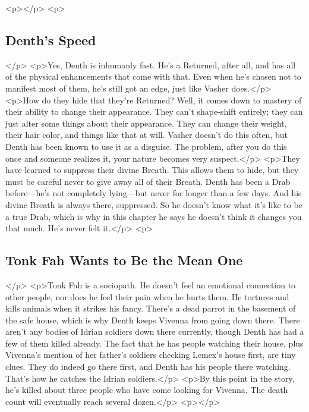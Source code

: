 <p></p>
<p>\subsection*{Denth’s Speed}</p>
<p>Yes, Denth is inhumanly fast. He’s a Returned, after all, and has all of the physical enhancements that come with that. Even when he’s chosen not to manifest most of them, he’s still got an edge, just like Vasher does.</p>
<p>How do they hide that they’re Returned? Well, it comes down to mastery of their ability to change their appearance. They can’t shape-shift entirely; they can just alter some things about their appearance. They can change their weight, their hair color, and things like that at will. Vasher doesn’t do this often, but Denth has been known to use it as a disguise. The problem, after you do this once and someone realizes it, your nature becomes very suspect.</p>
<p>They have learned to suppress their divine Breath. This allows them to hide, but they must be careful never to give away all of their Breath. Denth has been a Drab before—he’s not completely lying—but never for longer than a few days. And his divine Breath is always there, suppressed. So he doesn’t know what it’s like to be a true Drab, which is why in this chapter he says he doesn’t think it changes you that much. He’s never felt it.</p>
<p>\subsection*{Tonk Fah Wants to Be the Mean One}</p>
<p>Tonk Fah is a sociopath. He doesn’t feel an emotional connection to other people, nor does he feel their pain when he hurts them. He tortures and kills animals when it strikes his fancy. There’s a dead parrot in the basement of the safe house, which is why Denth keeps Vivenna from going down there. There aren’t any bodies of Idrian soldiers down there currently, though Denth has had a few of them killed already. The fact that he has people watching their house, plus Vivenna’s mention of her father’s soldiers checking Lemex’s house first, are tiny clues. They do indeed go there first, and Denth has his people there watching. That’s how he catches the Idrian soldiers.</p>
<p>By this point in the story, he’s killed about three people who have come looking for Vivenna. The death count will eventually reach several dozen.</p>
<p></p>




